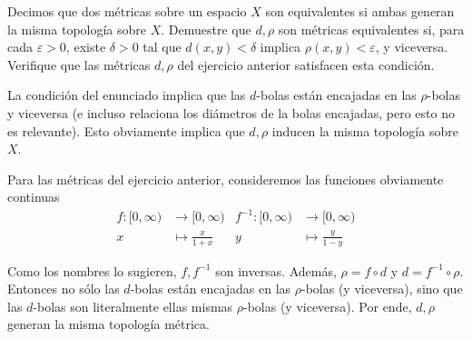 \begin{exercise}
Decimos que dos métricas sobre un espacio $X$ son equivalentes si ambas generan la misma topología sobre $X$. Demuestre que $d, \rho$ son métricas equivalentes si, para cada $\varepsilon > 0$, existe $\delta > 0$ tal que $d(x, y) < \delta$ implica $\rho(x, y) < \varepsilon$, y viceversa. Verifique que las métricas $d, \rho$ del ejercicio anterior satisfacen esta condición.
\end{exercise}

\begin{solution}
La condición del enunciado implica que las $d$-bolas están encajadas en las $\rho$-bolas y viceversa (e incluso relaciona los diámetros de la bolas encajadas, pero esto no es relevante). Esto obviamente implica que $d, \rho$ inducen la misma topología sobre $X$.

Para las métricas del ejercicio anterior, consideremos las funciones obviamente continuas
\begin{align*}
    f      : [0, \infty) & \longrightarrow [0, \infty) &
    f^{-1} : [0, \infty) & \longrightarrow [0, \infty) \\
    x & \longmapsto \frac x {1+x} &
    y & \longmapsto \frac y {1-y}
\end{align*}

Como los nombres lo sugieren, $f, f^{-1}$ son inversas. Además, $\rho = f \circ d$ y $d = f^{-1} \circ \rho$. Entonces no sólo las $d$-bolas están encajadas en las $\rho$-bolas (y viceversa), sino que las $d$-bolas son literalmente ellas mismas $\rho$-bolas (y viceversa). Por ende, $d, \rho$ generan la misma topología métrica.
\end{solution}

\newpage
